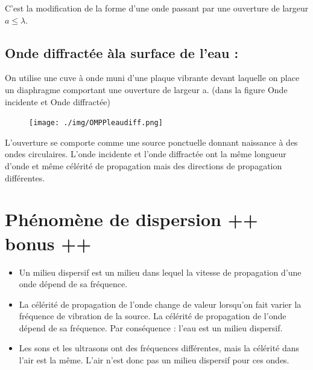 \documentclass[12pt]{article}
\begin{document}
C'est la modification de la forme d'une onde passant par une ouverture de largeur $a \leq \lambda$.

\subsection{Onde diffractée àla surface de l'eau :}
On utilise une cuve à onde muni d'une plaque vibrante devant laquelle on place un diaphragme comportant une ouverture de largeur a. (dans la figure Onde incidente et Onde diffractée)
\begin{figure}[h]
	\begin{center}
\vspace{-0.5cm}
	\texttt{[image: ./img/OMPPleaudiff.png]}
\end{center}
\vspace{-0.9cm}
\end{figure}

L'ouverture se comporte comme une source ponctuelle donnant naissance à des ondes circulaires.
L'onde incidente et l'onde diffractée ont la même longueur d'onde et même célérité de propagation mais des directions de
propagation différentes.

\section{Phénomène de dispersion ++ bonus ++ } 

\begin{tcolorbox}
	\begin{itemize}
		\item Un milieu dispersif est un milieu dans lequel la vitesse de propagation d'une onde dépend de sa fréquence.

		\item  La célérité de propagation de l'onde change de valeur lorsqu'on fait varier la fréquence de vibration de la source.
La célérité de propagation de l'onde dépend de sa fréquence.
Par conséquence : l'eau est un milieu dispersif.
\item Les sons et les ultrasons ont des fréquences différentes, mais la célérité dans l'air est la même. L'air
n'est donc pas un milieu dispersif pour ces ondes.
\end{itemize}
\end{tcolorbox}

\end{document}
